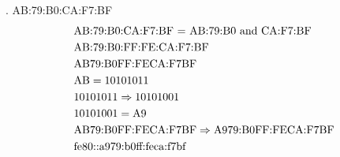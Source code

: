 \documentclass[11pt]{article}
\newcommand*{\vs}{\vspace{1cm}}
\newcommand*{\next}{\noindent}
\newcommand*{\set}{\setcounter{equation}{0}}
\begin{document}
\vs\next
6. AB:79:B0:CA:F7:BF
\begin{align}
    \set
    &\text{AB:79:B0:CA:F7:BF = AB:79:B0 and CA:F7:BF}\\
    &\text{AB:79:B0:FF:FE:CA:F7:BF}\\
    &\text{AB79:B0FF:FECA:F7BF}\\
    &\text{AB}=10101011\\
    &10101011\Rightarrow 10101001\\
    &10101001=\text{A9}\\
    &\text{AB79:B0FF:FECA:F7BF}\Rightarrow\text{A979:B0FF:FECA:F7BF}\\
    &\lowercase\text{FE80::A979:B0FF:FECA:F7BF}
\end{align}
\end{document}
